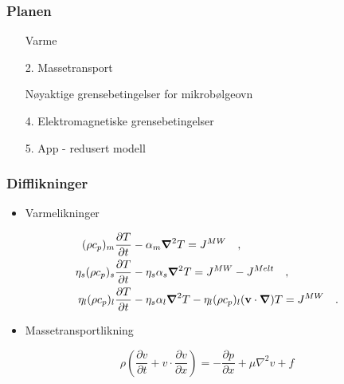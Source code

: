 \documentclass[screen]{beamer}
\renewcommand{\v}[1]{\ensuremath{\mathbf{#1}}} %
\newcommand{\gv}[1]{\ensuremath{\mbox{\boldmath$ #1 $}}}
\newcommand{\pd}[2]{\frac{\partial #1}{\partial #2}}
\newcommand{\grad}[1]{\gv{\nabla} #1} %
\newcommand{\checktick}{\textcolor{green}{\checked}}
\begin{document}
\begin{frame}
  \frametitle{Planen}
  \begin{enumerate}
  \item[\checktick] Varme
  \item[2.] Massetransport
  \item[\checktick] Nøyaktige grensebetingelser for mikrobølgeovn
\end{enumerate}
    \hline
\begin{enumerate}
  \item[4.] Elektromagnetiske grensebetingelser
  \item[5.] App - redusert modell
  \end{enumerate}
\end{frame}

\begin{frame}
\frametitle{Difflikninger}
\begin{itemize}
  \item Varmelikninger
\end{itemize}
\begin{align*}
  \label{eq:temp}
  (\rho c_p)_m \pd{T}{t} &- \alpha_m \grad{^2 T} = J^{MW} \quad \rm{,} \\
  \eta_s (\rho c_p)_s \pd{T}{t} &- \eta_s\alpha_s \grad{^2 T} = J^{MW} - J^{Melt}  \quad \rm{,} \\
  \eta_l (\rho c_p)_l \pd{T}{t} &- \eta_s\alpha_l \grad{^2 T} - \eta_l(\rho c_p)_l(\v{v}\cdot
  \grad{})T = J^{MW}  \quad \rm{.}
\end{align*}
\begin{itemize}
  \item Massetransportlikning
\end{itemize}
\begin{equation*}
  \rho \left(\pd{v}{t} + v \cdot \pd{v}{x}\right) = -\pd{p}{x} + \mu \nabla^2 v + f
 \label{eq:navier-stokes}
\end{equation*}
\end{frame}
\end{document}
